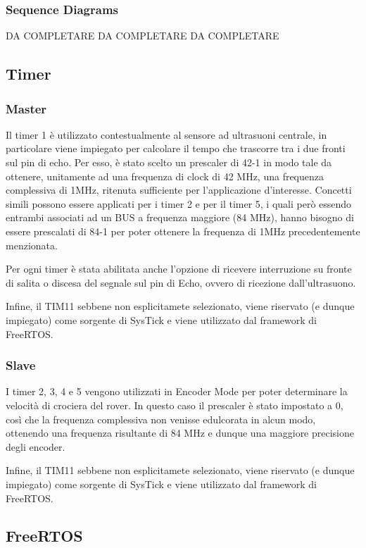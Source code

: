 \documentclass{article}
\begin{document}
      \subsubsection{Sequence Diagrams}
      DA COMPLETARE DA COMPLETARE DA COMPLETARE
    \subsection{Timer}
        \subsubsection{Master}
          Il timer 1 è utilizzato contestualmente al sensore ad ultrasuoni centrale, in particolare viene impiegato per calcolare il tempo che trascorre tra i due fronti sul pin di echo. Per esso, è stato scelto un prescaler di 42-1 in modo tale da ottenere, unitamente ad una frequenza di clock di 42 MHz, una frequenza complessiva di 1MHz, ritenuta sufficiente per l'applicazione d'interesse. Concetti simili possono essere applicati per i timer 2 e per il timer 5, i quali però essendo entrambi associati ad un BUS a frequenza maggiore (84 MHz), hanno bisogno di essere prescalati di 84-1 per poter ottenere la frequenza di 1MHz precedentemente menzionata. 

          Per ogni timer è stata abilitata anche l'opzione di ricevere interruzione su fronte di salita o discesa del segnale sul pin di Echo, ovvero di ricezione dall'ultrasuono. 

          Infine, il TIM11 sebbene non esplicitamete selezionato, viene riservato (e dunque impiegato) come sorgente di SysTick e viene utilizzato dal framework di FreeRTOS. 

        \subsubsection{Slave} I timer 2, 3, 4 e 5 vengono utilizzati in Encoder Mode per poter determinare la velocità di crociera del rover. In questo caso il prescaler è stato impostato a 0, così che la frequenza complessiva non venisse edulcorata in alcun modo,  ottenendo una frequenza risultante di 84 MHz e dunque una maggiore precisione degli encoder. 

        Infine, il TIM11 sebbene non esplicitamete selezionato, viene riservato (e dunque impiegato) come sorgente di SysTick e viene utilizzato dal framework di FreeRTOS.


    \subsection{FreeRTOS}
\end{document}
